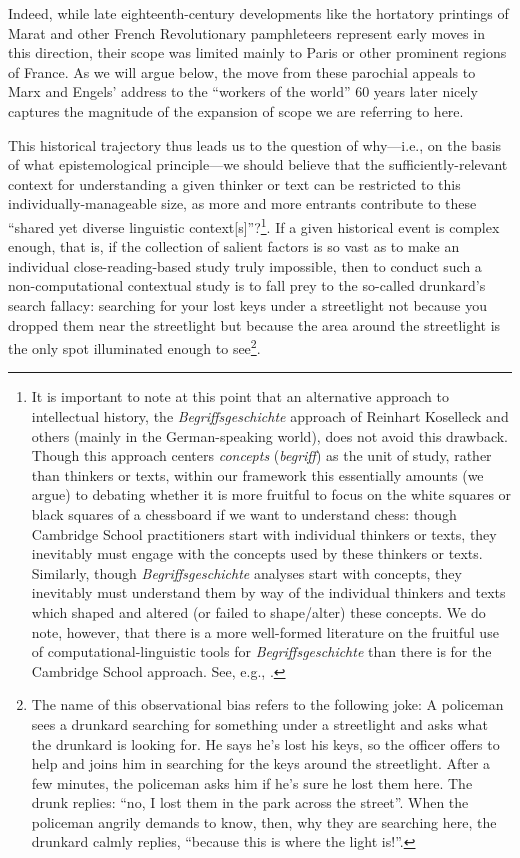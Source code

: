 \documentclass[11pt]{article}
\begin{document}
Indeed, while late eighteenth-century developments like the hortatory printings of Marat and other French Revolutionary pamphleteers represent early moves in this direction, their scope was limited mainly to Paris or other prominent regions of France. As we will argue below, the move from these parochial appeals to Marx and Engels' address to the ``workers of the world'' 60 years later nicely captures the magnitude of the expansion of scope we are referring to here.

This historical trajectory thus leads us to the question of why---i.e., on the basis of what epistemological principle---we should believe that the sufficiently-relevant context for understanding a given thinker or text can be restricted to this individually-manageable size, as more and more entrants contribute to these ``shared yet diverse linguistic context[s]''?\footnote{It is important to note at this point that an alternative approach to intellectual history, the \textit{Begriffsgeschichte} approach of Reinhart Koselleck and others (mainly in the German-speaking world), does not avoid this drawback. Though this approach centers \textit{concepts} (\textit{begriff}) as the unit of study, rather than thinkers or texts, within our framework this essentially amounts (we argue) to debating whether it is more fruitful to focus on the white squares or black squares of a chessboard if we want to understand chess: though Cambridge School practitioners start with individual thinkers or texts, they inevitably must engage with the concepts used by these thinkers or texts. Similarly, though \textit{Begriffsgeschichte} analyses start with concepts, they inevitably must understand them by way of the individual thinkers and texts which shaped and altered (or failed to shape/alter) these concepts. We do note, however, that there is a more well-formed literature on the fruitful use of computational-linguistic tools for \textit{Begriffsgeschichte} than there is for the Cambridge School approach. See, e.g., \cite{wevers_digital_2020}.}. If a given historical event is complex enough, that is, if the collection of salient factors is so vast as to make an individual close-reading-based study truly impossible, then to conduct such a non-computational contextual study is to fall prey to the so-called drunkard's search fallacy: searching for your lost keys under a streetlight not because you dropped them near the streetlight but because the area around the streetlight is the only spot illuminated enough to see\footnote{The name of this observational bias refers to the following joke: A policeman sees a drunkard searching for something under a streetlight and asks what the drunkard is looking for. He says he's lost his keys, so the officer offers to help and joins him in searching for the keys around the streetlight. After a few minutes, the policeman asks him if he's sure he lost them here. The drunk replies: ``no, I lost them in the park across the street''. When the policeman angrily demands to know, then, why they are searching here, the drunkard calmly replies, ``because this is where the light is!''.}.
\end{document}
